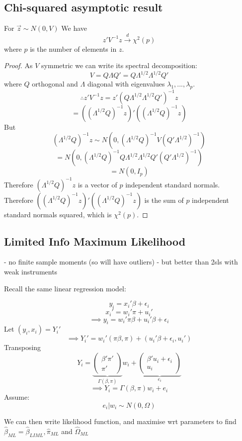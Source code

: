 \documentclass[DIV=14,titlepage=false]{scrreprt}
\begin{document}
\subsection{Chi-squared asymptotic result}
\vspace{5mm}
\begin{lemma}
For \(\vec z\sim N(0,V)\)
We have \[z'V^{-1}z\xrightarrow{d}\chi^2(p)\]
where \(p\) is the number of elements in \(z\).
\end{lemma}
\vspace{5mm}
\begin{proof}
    As \(V\) symmetric we can write its spectral decomposition:
    \[V=Q\Lambda Q'=Q\Lambda^{1/2}\Lambda^{1/2}Q'\]
    where \(Q\) orthogonal and \(\Lambda\) diagonal with eigenvalues \(\lambda_1,...,\lambda_p\).
    \[\therefore z'V^{-1}z=z'(Q\Lambda^{1/2}\Lambda^{1/2}Q')^{-1}z\]
    \[=((\Lambda^{1/2}Q)^{-1}z)'((\Lambda^{1/2}Q)^{-1}z)\]
    But
    \[(\Lambda^{1/2}Q)^{-1}z\sim N(0,(\Lambda^{1/2}Q)^{-1}V(Q'\Lambda^{1/2})^{-1})\]
    \[=N(0,(\Lambda^{1/2}Q)^{-1}Q\Lambda^{1/2}\Lambda^{1/2}Q'(Q'\Lambda^{1/2})^{-1})\]
    \[=N(0,I_p)\]
    Therefore \((\Lambda^{1/2}Q)^{-1}z\) is a vector of \(p\) independent standard normals.
    \\ Therefore \(((\Lambda^{1/2}Q)^{-1}z)'((\Lambda^{1/2}Q)^{-1}z)\) is the sum of \(p\) independent standard normals squared, which is \(\chi^2(p)\). 
\end{proof}

\subsection{Limited Info Maximum Likelihood}
- no finite sample moments (so will have outliers)
- but better than 2sls with weak instruments

Recall the same linear regression model:

\[y_i=x_i'\beta+\epsilon_i\]
\[x_i'=w_i'\pi+u_i'\]
\[\implies y_i=w_i'\pi\beta+u_i'\beta+\epsilon_i\]
Let \((y_i,x_i) = Y_i'\)
\[\implies Y_i'=w_i'(\pi\beta, \pi)+(u_i'\beta+\epsilon_i, u_i')\]
Transposing
\[Y_i=\underbrace{\begin{pmatrix} \beta'\pi' \\ \pi'\end{pmatrix}}_{\Gamma(\beta,\pi)}w_i+\underbrace{\begin{pmatrix} \beta'u_i+\epsilon_i \\ u_i\end{pmatrix}}_{e_i}\]
\[\implies Y_i=\Gamma(\beta,\pi)w_i+e_i\]
Assume:
\[e_i|w_i\sim N(0,\Omega)\]

We can then write likelihood function, and maximise wrt parameters to find
\(\hat \beta_{ML}=\hat \beta_{LIML}, \hat \pi_{ML}\) and \(\hat \Omega_{ML}\)
\end{document}
